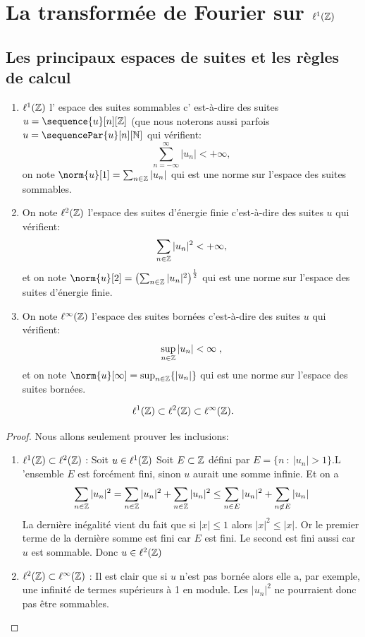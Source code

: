 \section{La transform\'ee de Fourier sur $\ell^1(\mathbb{Z})$}
\subsection{Les principaux espaces de suites et les r\`{e}gles de calcul}
\begin{definition}
\begin{enumerate}[label=(\roman*)]
\item  $\ell^1(\mathbb{Z})$ l' espace des suites sommables  c' est-\`{a}-dire des suites $u = \sequence{u}[n][\zset]$ (que nous noterons aussi parfois $u=\sequencePar{u}[n][\nset]$ qui v\'{e}rifient:
$$
\sum_{n=-\infty}^\infty |u_{n}|<+\infty,
$$
on note $\norm{u}[1] =\sum_{n\in \zset}|u_{n}|$ qui est une norme sur l'espace des suites sommables.
\item On note $\ell^2(\mathbb{Z})$ l'espace des suites d'\'{e}nergie finie c'est-\`{a}-dire des suites $u$ qui v\'{e}rifient:
$$
\sum_{n\in \mathbb{Z}}|u_{n}|^{2}<+\infty,
$$
et on note $\norm{u}[2]=\left(\sum_{n\in \zset}|u_{n}|^{2}\right)^{\frac{1}{2}}$
qui est une norme sur l'espace des suites d'\'{e}nergie finie.
\item On note $\ell^\infty(\mathbb{Z})$ l'espace des suites born\'{e}es c'est-\`{a}-dire des suites $u$ qui v\'{e}rifient:
$$
\sup_{n \in \mathbb{Z}} |u_{n}| < \infty \;,
$$
et on note $\norm{u}[\infty]=\sup_{n\in \zset}\{|u_{n}|\}$ qui est une norme sur l'espace des suites born\'{e}es.
\end{enumerate}
\end{definition}
\begin{lemma}
$$
\ell^1(\mathbb{Z}) \subset \ell^2(\mathbb{Z}) \subset \ell^\infty(\mathbb{Z}) .
$$
\end{lemma}
\begin{proof}
Nous allons seulement prouver les inclusions:
\begin{enumerate}
\item $\ell^1(\mathbb{Z}) \subset \ell^2(\mathbb{Z})$ : Soit $u\in \ell^1(\mathbb{Z})$ Soit $E\subset \mathbb{Z}$ d\'{e}fini par $E=\{n\ :\ |u_{n}|>1\}. \mathrm{L}$'ensemble $E$ est forc\'{e}ment fini, sinon $u$ aurait une somme infinie. Et on a
$$
\sum_{n \in \mathbb{Z}} |u_{n}|^{2}=\sum_{n \in \mathbb{Z}} |u_{n}|^{2}+\sum_{n \in \mathbb{Z}} |u_{n}|^{2}\leq\sum_{n \in E} |u_{n}|^{2}+\sum_{n \not \in E}|u_{n}|
$$
La derni\`{e}re in\'{e}galit\'{e} vient du fait que si $|x|\leq 1$ alors $|x|^{2}\leq|x|$. Or le premier terme de la derni\`{e}re somme est fini car $E$ est fini. Le second est fini aussi car $u$ est sommable. Donc $u\in \ell^2(\mathbb{Z})$
\item $\ell^2(\mathbb{Z})\subset \ell^\infty(\mathbb{Z})$ : Il est clair que si $u$ n'est pas born\'{e}e alors elle $\mathrm{a}$, par exemple, une infinit\'{e} de termes sup\'{e}rieurs \`{a} 1 en module. Les $|u_{n}|^{2}$ ne pourraient donc pas \^{e}tre sommables.
\end{enumerate}
\end{proof}
